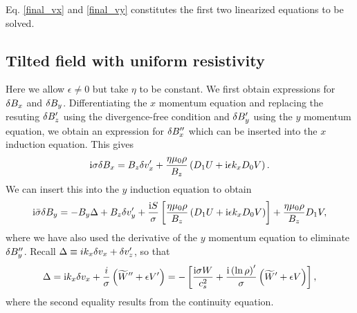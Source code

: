 Eq. \ref{final_vx} and \ref{final_vy} constitutes the first two
linearized equations to be solved.

\subsection{Tilted field with uniform resistivity}
Here we allow $\epsilon\neq 0$ but take $\eta$ to be constant. We
first obtain expressions for $\delta B_x$ and $\delta B_y$. Differentiating
the $x$ momentum equation and replacing the resuting $\delta B_z^\prime$
using the divergence-free condition and $\delta B_y^\prime$ using the $y$
momentum equation, we obtain an expression for $\delta B_x^{\prime\prime}$
which can be inserted into the $x$ induction equation. This gives
\begin{align}
  \mathrm{i}\sigma\delta B_x = B_z\delta v_x^\prime +
  \frac{\eta\mu_0\rho}{B_z}\left( D_1 U + \mathrm{i}\epsilon k_x D_0
  V\right).\label{bx_tilted}  
\end{align}
We can insert this into the $y$ induction equation to obtain
\begin{align}
  \mathrm{i}\bar{\sigma}\delta B_y = -B_y\Delta + B_z\delta v_y^\prime + \frac{\mathrm{i}
    S}{\sigma}\left[\frac{\eta\mu_0\rho}{B_z}\left( D_1 U + \mathrm{i}\epsilon k_x D_0
  V\right)\right] + \frac{\eta\mu_0\rho}{B_z}D_1V,\label{by_tilted}
\end{align} 
where we have also used the derivative of the $y$ momentum equation to
eliminate  $\delta B_y^{\prime\prime}$. Recall $\Delta \equiv i k_x \delta v_x +
\delta v_z^\prime$, so that
\begin{align}
  \Delta = \mathrm{i} k_x \delta v_x + \frac{i}{\sigma}\left(\widetilde{W}^{\prime\prime} +
  \epsilon V^\prime\right) = -\left[\frac{\mathrm{i}\sigma W}{c_s^2} +
    \frac{\mathrm{i}\left(\ln{\rho}\right)^\prime}{\sigma}\left(\widetilde{W}^\prime +
    \epsilon V\right)\right], 
\end{align}
where the second equality results from the continuity equation. 

